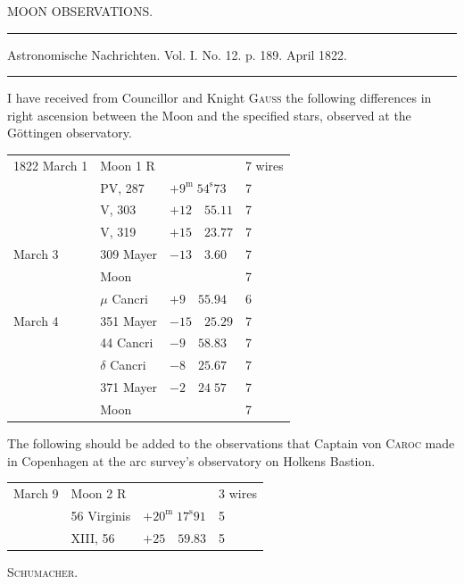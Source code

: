 \clearpage
\hypertarget{native-446-part-lower}{}
\begin{center}
{\large MOON OBSERVATIONS.}

\noindent\rule{\linewidth}{0.4pt}

Astronomische Nachrichten. Vol. I. No. 12. p. 189. April 1822.

\noindent\rule{\linewidth}{0.4pt}
\end{center}

I have received from Councillor and Knight \textsc{Gauss} the following differences in right ascension between the Moon and the specified stars, observed at the Göttingen observatory.

\begin{center}
\begin{tabular}{l|l|l|l}
1822 March 1 & Moon 1 R & & 7 wires \\
 & PV, 287 & $+9^{\mathrm{m}}\;54^{\mathrm{s}}73$ & 7 \\
 & V, 303 & $+12\quad55.11$ & 7 \\
 & V, 319 & $+15\quad23.77$ & 7 \\
March 3 & 309 Mayer & $-13\quad3.60$ & 7 \\
 & Moon & & 7 \\
 & $\mu$ Cancri & $+9\quad55.94$ & 6 \\
March 4 & 351 Mayer & $-15\quad25.29$ & 7 \\
 & 44 Cancri & $-9\quad58.83$ & 7 \\
 & $\delta$ Cancri & $-8\quad25.67$ & 7 \\
 & 371 Mayer & $-2\quad24\;57$ & 7 \\
 & Moon & & 7 \\
\end{tabular}
\end{center}

The following should be added to the observations that Captain von \textsc{Caroc} made in Copenhagen at the arc survey’s observatory on Holkens Bastion.

\begin{center}
\begin{tabular}{l|l|l|l}
March 9 & Moon 2 R & & 3 wires \\
 & 56 Virginis & $+20^{\mathrm{m}}\;17^{\mathrm{s}}91$ & 5 \\
 & XIII, 56 & $+25\quad59.83$ & 5 \\
\end{tabular}
\end{center}

\begin{flushright}
\textsc{Schumacher}.
\end{flushright}
